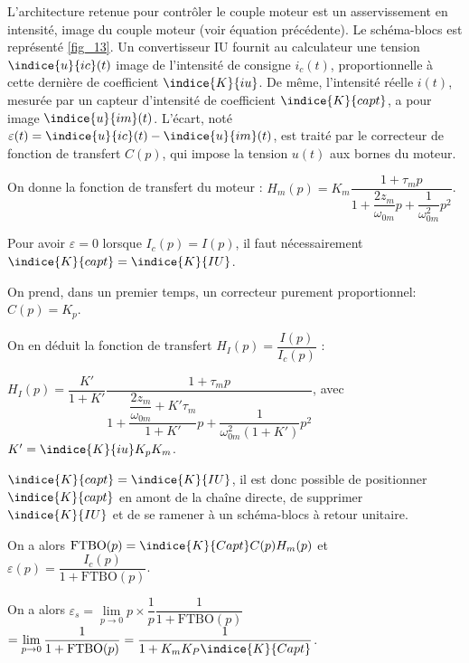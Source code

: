 L’architecture retenue pour contrôler le couple moteur est un asservissement en intensité, image du
couple moteur (voir équation précédente). Le schéma-blocs est représenté \autoref{fig_13}. Un convertisseur IU
fournit au calculateur une tension $\indice{u}{ic}(t)$ image de l’intensité de consigne $i_c(t)$, proportionnelle à cette
dernière de coefficient $\indice{K}{iu}$. De même, l’intensité réelle $i(t)$, mesurée par un capteur d’intensité de
coefficient $\indice{K}{capt}$, a pour image $\indice{u}{im}(t)$. L’écart, noté $\varepsilon(t) = \indice{u}{ic}(t) - \indice{u}{im}(t)$, est traité par le correcteur de fonction de transfert $C(p)$, qui impose la tension $u(t)$ aux bornes du moteur.

On donne la fonction de transfert du moteur : $H_m(p)=K_m\dfrac{1+\tau_m p}{1+\dfrac{2z_m}{\omega_{0m}}p+\dfrac{1}{\omega_{0m}^2}p^2}$.

\fi

\ifprof
\begin{corrige}

Pour avoir $\varepsilon = 0$ lorsque $I_c(p)=I(p)$, il faut nécessairement $\indice{K}{capt}=\indice{K}{IU}$.
\end{corrige}
\else
\fi

\ifprof
\else

On prend, dans un premier temps, un correcteur purement proportionnel: $C(p)=K_p$.

On en déduit la fonction de transfert $H_I(p)=\dfrac{I(p)}{I_c(p)}$ :

$H_I(p)=\dfrac{K'}{1+K'}\dfrac{1+\tau_m p}{1+  
\dfrac{\dfrac{2z_m}{\omega_{0m}}+ K'\tau_m}{1+K'}p 
+ \dfrac{1}{\omega_{0m}^2(1+K')} p^2}$, avec $K'=\indice{K}{iu}K_pK_m$.

\fi

\ifprof
\begin{corrige}
$\indice{K}{capt}=\indice{K}{IU}$, il est donc possible de positionner $\indice{K}{capt}$ en amont de la chaîne directe, de supprimer $\indice{K}{IU}$ et de se ramener à un schéma-blocs à retour unitaire. 

On a alors $\text{FTBO}(p)=\indice{K}{Capt}C(p)H_m(p)$ et 
$\varepsilon(p)=\dfrac{I_c(p)}{1+\text{FTBO}(p)}$.

On a alors $\varepsilon_s = \lim\limits_{p \to 0 } p\times\dfrac{1}{p}\dfrac{1}{1+\text{FTBO}(p)}$  
$= \lim\limits_{p \to 0 } \dfrac{1}{1+\text{FTBO}(p)} = \dfrac{1}{1+K_m K_P \indice{K}{Capt}} $.
\end{corrige}
\else
\fi


